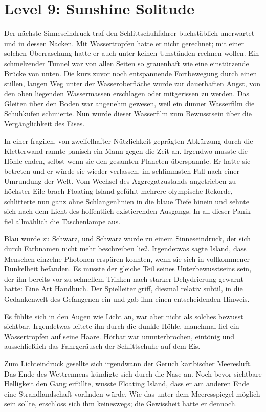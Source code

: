 \section{Level 9: Sunshine Solitude}

Der nächste Sinneseindruck traf den Schlittschuhfahrer buchstäblich unerwartet und in dessen Nacken. Mit Wassertropfen hatte er nicht gerechnet; mit einer solchen Überraschung hatte er auch unter keinen Umständen rechnen wollen. Ein schmelzender Tunnel war von allen Seiten so grauenhaft wie eine einstürzende Brücke von unten. Die kurz zuvor noch entspannende Fortbewegung durch einen stillen, langen Weg unter der Wasseroberfläche wurde zur dauerhaften Angst, von den oben liegenden Wassermassen erschlagen oder mitgerissen zu werden. Das Gleiten über den Boden war angenehm gewesen, weil ein dünner Wasserfilm die Schuhkufen schmierte. Nun wurde dieser Wasserfilm zum Bewusstsein über die Vergänglichkeit des Eises.

In einer fragilen, von zweifelhafter Nützlichkeit geprägten Abkürzung durch die Kletterwand rannte panisch ein Mann gegen die Zeit an. Irgendwo musste die Höhle enden, selbst wenn sie den gesamten Planeten überspannte. Er hatte sie betreten und er würde sie wieder verlassen, im schlimmsten Fall nach einer Umrundung der Welt. Vom Wechsel des Aggregatzustands angetrieben zu höchster Eile brach Floating Island gefühlt mehrere olympische Rekorde, schlitterte nun ganz ohne Schlangenlinien in die blaue Tiefe hinein und sehnte sich nach dem Licht des hoffentlich existierenden Ausgangs. In all dieser Panik fiel allmählich die Taschenlampe aus.

Blau wurde zu Schwarz, und Schwarz wurde zu einem Sinneseindruck, der sich durch Farbnamen nicht mehr beschreiben ließ. Irgendetwas sagte Island, dass Menschen einzelne Photonen erspüren konnten, wenn sie sich in vollkommener Dunkelheit befanden. Es musste der gleiche Teil seines Unterbewusstseins sein, der ihn bereits vor zu schnellem Trinken nach starker Dehydrierung gewarnt hatte: Eine Art Handbuch. Der Spielleiter griff, diesmal relativ subtil, in die Gedankenwelt des Gefangenen ein und gab ihm einen entscheidenden Hinweis.

Es fühlte sich in den Augen wie Licht an, war aber nicht als solches bewusst sichtbar. Irgendetwas leitete ihn durch die dunkle Höhle, manchmal fiel ein Wassertropfen auf seine Haare. Hörbar war ununterbrochen, eintönig und ausschließlich das Fahrgeräusch der Schlittschuhe auf dem Eis.

Zum Lichteindruck gesellte sich irgendwann der Geruch karibischer Meeresluft. Das Ende des Wettrennens kündigte sich durch die Nase an. Noch bevor sichtbare Helligkeit den Gang erfüllte, wusste Floating Island, dass er am anderen Ende eine Strandlandschaft vorfinden würde. Wie das unter dem Meeresspiegel möglich sein sollte, erschloss sich ihm keineswegs; die Gewissheit hatte er dennoch.

